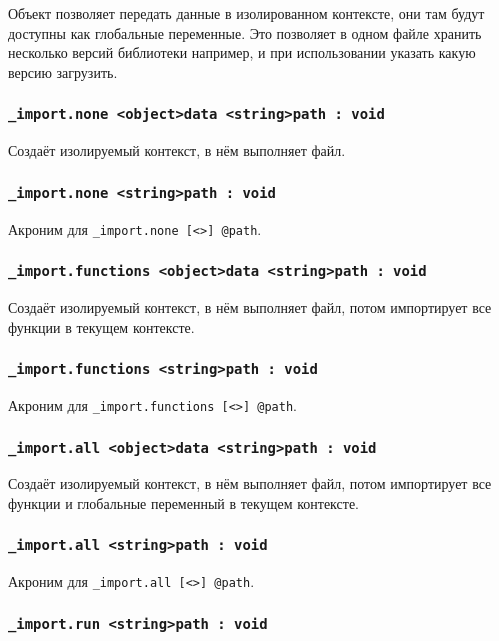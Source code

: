 Объект  позволяет передать данные в изолированном контексте, они там будут доступны как глобальные переменные. Это позволяет в одном файле хранить несколько версий библиотеки например, и при использовании указать какую версию загрузить.

\subsubsection{\lstinline|_import.none <object>data <string>path : void|}

Создаёт изолируемый контекст, в нём выполняет файл.

\subsubsection{\lstinline|_import.none <string>path : void|}

Акроним для \lstinline|_import.none [<>] @path|.

\subsubsection{\lstinline|_import.functions <object>data <string>path : void|}

Создаёт изолируемый контекст, в нём выполняет файл, потом импортирует все функции в текущем контексте.

\subsubsection{\lstinline|_import.functions <string>path : void|}

Акроним для \lstinline|_import.functions [<>] @path|.

\subsubsection{\lstinline|_import.all <object>data <string>path : void|}

Создаёт изолируемый контекст, в нём выполняет файл, потом импортирует все функции и глобальные переменный в текущем контексте.

\subsubsection{\lstinline|_import.all <string>path : void|}

Акроним для \lstinline|_import.all [<>] @path|.

\subsubsection{\lstinline|_import.run <string>path : void|}

